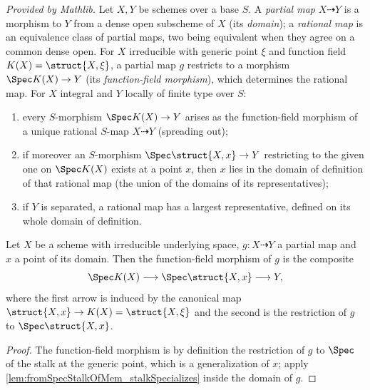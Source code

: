 \begin{definition}
  \label{def:rational_map_machinery}
  \mathlibok
  \textit{Provided by Mathlib.}
  Let \(X, Y\) be schemes over a base \(S\). A \emph{partial map} \(X \dashrightarrow Y\)
  is a morphism to \(Y\) from a dense open subscheme of \(X\) (its \emph{domain}); a
  \emph{rational map} is an equivalence class of partial maps, two being equivalent when
  they agree on a common dense open. For \(X\) irreducible with generic point \(\xi\) and
  function field \(K(X) = \struct{X,\xi}\), a partial map \(g\) restricts to a morphism
  \(\Spec K(X) \to Y\) (its \emph{function-field morphism}), which determines the rational
  map. For \(X\) integral and \(Y\) locally of finite type over \(S\):
  \begin{enumerate}
    \item every \(S\)-morphism \(\Spec K(X) \to Y\) arises as the function-field morphism
      of a unique rational \(S\)-map \(X \dashrightarrow Y\) (spreading out);
    \item if moreover an \(S\)-morphism \(\Spec \struct{X,x} \to Y\) restricting to the
      given one on \(\Spec K(X)\) exists at a point \(x\), then \(x\) lies in the domain
      of definition of that rational map (the union of the domains of its
      representatives);
    \item if \(Y\) is separated, a rational map has a largest representative, defined on
      its whole domain of definition.
  \end{enumerate}
\end{definition}

\begin{lemma}
  \label{lem:partialMap_fromFunctionField_eq}
  \leanok
  Let \(X\) be a scheme with irreducible underlying space, \(g : X \dashrightarrow Y\) a
  partial map and \(x\) a point of its domain. Then the function-field morphism of \(g\)
  is the composite
  \[
    \Spec K(X) \longrightarrow \Spec \struct{X,x}
      \longrightarrow Y,
  \]
  where the first arrow is induced by the canonical map
  \(\struct{X,x} \to K(X) = \struct{X,\xi}\) and the second is the restriction of \(g\) to
  \(\Spec \struct{X,x}\).
\end{lemma}
\begin{proof}
  \leanok
  The function-field morphism is by definition the restriction of \(g\) to
  \(\Spec\) of the stalk at the generic point, which is a generalization of \(x\); apply
  \ref{lem:fromSpecStalkOfMem_stalkSpecializes} inside the domain of \(g\).
\end{proof}

